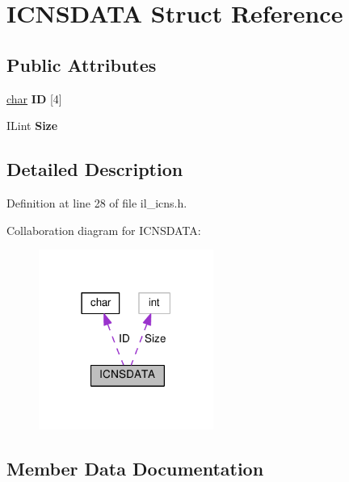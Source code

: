 \hypertarget{structICNSDATA}{}\section{I\+C\+N\+S\+D\+A\+TA Struct Reference}
\label{structICNSDATA}
\subsection*{Public Attributes}
\begin{DoxyCompactItemize}
\item 
\mbox{\label{structICNSDATA_a8b18d7d7173c954f8f9ce4d3d0f6c6aa}} 
\hyperlink{classchar}{char} {\bfseries ID} \mbox{[}4\mbox{]}
\item 
\mbox{\label{structICNSDATA_a95f5c1d922a2385d285db1e2102e00c2}} 
I\+Lint {\bfseries Size}
\end{DoxyCompactItemize}


\subsection{Detailed Description}


Definition at line 28 of file il\+\_\+icns.\+h.



Collaboration diagram for I\+C\+N\+S\+D\+A\+TA\+:
\nopagebreak
\begin{figure}[H]
\begin{center}
\leavevmode
\includegraphics[width=162pt]{d8/d53/structICNSDATA__coll__graph}
\end{center}
\end{figure}


\subsection{Member Data Documentation}
\mbox{\label{structICNSDATA_a8b18d7d7173c954f8f9ce4d3d0f6c6aa}} 
